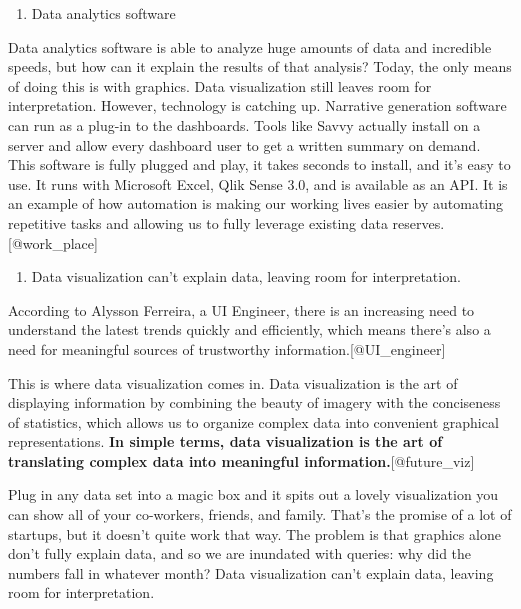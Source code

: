 \documentclass[]{book}
\providecommand{\tightlist}{%
  \setlength{\itemsep}{0pt}\setlength{\parskip}{0pt}}
\theoremstyle{definition}
\theoremstyle{definition}
\theoremstyle{definition}
\theoremstyle{remark}
\begin{document}
\begin{enumerate}
\def\labelenumi{\arabic{enumi}.}
\setcounter{enumi}{3}
\tightlist
\item
  Data analytics software
\end{enumerate}

Data analytics software is able to analyze huge amounts of data and
incredible speeds, but how can it explain the results of that analysis?
Today, the only means of doing this is with graphics. Data visualization
still leaves room for interpretation. However, technology is catching
up. Narrative generation software can run as a plug-in to the
dashboards. Tools like Savvy actually install on a server and allow
every dashboard user to get a written summary on demand. This software
is fully plugged and play, it takes seconds to install, and it's easy to
use. It runs with Microsoft Excel, Qlik Sense 3.0, and is available as
an API. It is an example of how automation is making our working lives
easier by automating repetitive tasks and allowing us to fully leverage
existing data reserves.{[}@work\_place{]}

\begin{enumerate}
\def\labelenumi{\arabic{enumi}.}
\setcounter{enumi}{4}
\tightlist
\item
  Data visualization can't explain data, leaving room for
  interpretation.
\end{enumerate}

According to Alysson Ferreira, a UI Engineer, there is an increasing
need to understand the latest trends quickly and efficiently, which
means there's also a need for meaningful sources of trustworthy
information.{[}@UI\_engineer{]}

This is where data visualization comes in. Data visualization is the art
of displaying information by combining the beauty of imagery with the
conciseness of statistics, which allows us to organize complex data into
convenient graphical representations. \textbf{In simple terms, data
visualization is the art of translating complex data into meaningful
information.}{[}@future\_viz{]}

Plug in any data set into a magic box and it spits out a lovely
visualization you can show all of your co-workers, friends, and family.
That's the promise of a lot of startups, but it doesn't quite work that
way. The problem is that graphics alone don't fully explain data, and so
we are inundated with queries: why did the numbers fall in whatever
month? Data visualization can't explain data, leaving room for
interpretation.
\end{document}
